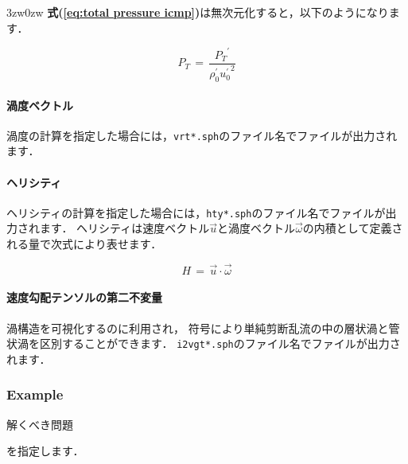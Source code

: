 \begin{indentation}{3zw}{0zw}
\textbf{式(\ref{eq:total pressure icmp})}は無次元化すると，以下のようになります．

\begin{equation}
P_{T} \,=\, \frac{{P_{T}}^{\prime}}{\rho_{\mathit{0}}^{\prime} {u_{\mathit{0}}^{\prime}}^{2}}
\label{eq:total pressure icmp ND}
\end{equation}

%
\paragraph{渦度ベクトル}
渦度の計算を指定した場合には，\verb|vrt*.sph|のファイル名でファイルが出力されます．

%
\paragraph{ヘリシティ}
ヘリシティの計算を指定した場合には，\verb|hty*.sph|のファイル名でファイルが出力されます．
ヘリシティは速度ベクトル$\overrightarrow{u}$と渦度ベクトル$\overrightarrow{\omega}$の内積として定義される量で次式により表せます．

\begin{equation}
H \,=\, \overrightarrow{u} \cdot \overrightarrow{\omega}
\label{eq:helicity}
\end{equation}


%
\paragraph{速度勾配テンソルの第二不変量}
渦構造を可視化するのに利用され，
符号により単純剪断乱流の中の層状渦と管状渦を区別することができます\cite{tanaka:93:PF}．
\verb|i2vgt*.sph|のファイル名でファイルが出力されます．

\end{indentation}



\pagebreak
\subsubsection{Example}

\hypertarget{tgt:example}{解くべき問題}を指定します．

